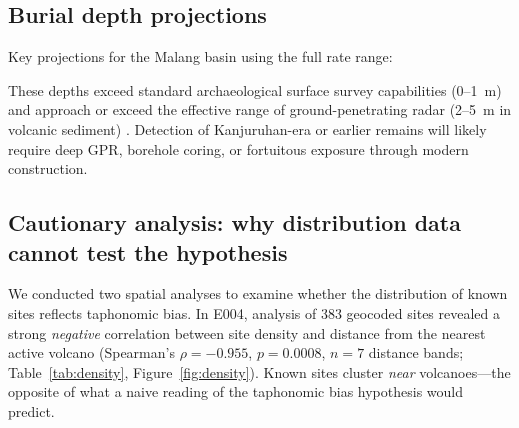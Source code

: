 \documentclass[12pt,a4paper]{article}
\begin{document}
\subsection{Burial depth projections}

Key projections for the Malang basin using the full rate range:

\begin{table}[htbp]
\centering
\caption{Projected burial depth by era using empirically-derived sedimentation rates.}
\label{tab:depth}
\end{table}

These depths exceed standard archaeological surface survey capabilities (0--1~m) and approach or exceed the effective range of ground-penetrating radar (2--5~m in volcanic sediment) \citep{conyers2004,goodman2013}. Detection of Kanjuruhan-era or earlier remains will likely require deep GPR, borehole coring, or fortuitous exposure through modern construction.

\subsection{Cautionary analysis: why distribution data cannot test the hypothesis}

We conducted two spatial analyses to examine whether the distribution of known sites reflects taphonomic bias. In E004, analysis of 383 geocoded sites revealed a strong \textit{negative} correlation between site density and distance from the nearest active volcano (Spearman's $\rho = -0.955$, $p = 0.0008$, $n = 7$ distance bands; Table~\ref{tab:density}, Figure~\ref{fig:density}). Known sites cluster \textit{near} volcanoes---the opposite of what a naive reading of the taphonomic bias hypothesis would predict.
\end{document}
